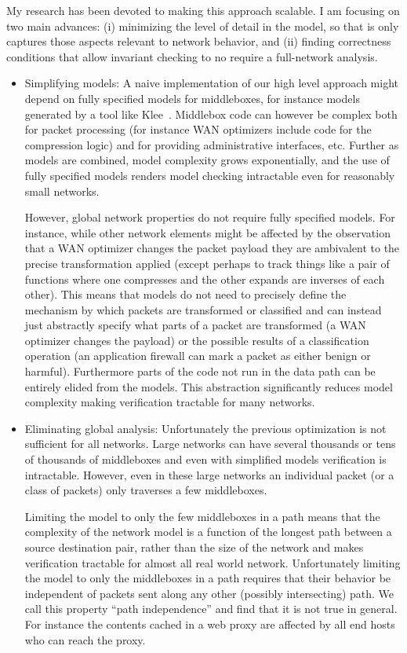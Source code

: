 \documentclass[letterpaper]{article}
\begin{document}
My research has been devoted to making this approach scalable. I am focusing on two main advances: (i) minimizing the level of detail in the model, so that is only captures those aspects relevant to network behavior, and (ii) finding correctness conditions that allow invariant checking to no require a full-network analysis.

\begin{itemize}
\item Simplifying models:  A naive implementation of our high level approach might depend on fully specified models for middleboxes, for instance
models generated by a tool like Klee~\cite{cadar2008klee}. Middlebox code can however be complex both for packet
processing (for instance WAN optimizers include code for the compression logic) and for providing administrative
interfaces, etc. Further as models are combined, model complexity grows exponentially, and the use of fully specified
models renders model checking intractable even for reasonably small networks.

However, global network properties do not require fully specified models. For instance, while other
network elements might be affected by the observation that a WAN optimizer changes the packet payload they are
ambivalent to the precise transformation applied (except perhaps to track things like a pair of functions
where one compresses and the other expands are inverses of each other). This  means that models do not need to precisely
define the mechanism by which packets are transformed or classified and can instead just abstractly specify what parts of a
packet are transformed (a WAN optimizer changes the payload) or the possible results of a classification operation (an
application firewall can mark a packet as either benign or harmful). Furthermore parts of the code not run in
the data path can be entirely elided from the models. This abstraction significantly reduces model complexity making
verification tractable for many networks.

\item Eliminating global analysis:
Unfortunately the previous optimization is not sufficient for all networks. Large networks can have
several thousands or tens of thousands of middleboxes and even with simplified models verification is intractable. However, even
in these large networks an individual packet (or a class of packets) only traverses a few middleboxes.  

Limiting the model to only the few middleboxes in a path means that the complexity of the network model is a function of
the longest path between a source destination pair, rather than the size of the network and makes verification tractable
for almost all real world network. Unfortunately limiting the model to only the middleboxes in a path requires that
their behavior be independent of packets sent along any other (possibly intersecting) path. We call this property ``path
independence'' and find that it is not true in general. For instance the contents cached in a web proxy are affected by
all end hosts who can reach the proxy. 


\end{itemize}
\end{document}
